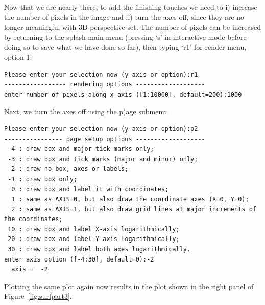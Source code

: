 \documentclass[a4paper,11pt]{article}
\begin{document}
 Now that we are nearly there, to add the finishing touches we need to i) increase the number of pixels in the image and ii) turn the axes off, since they are no longer meaningful with 3D perspective set. The number of pixels can be increased by returning to the splash main menu (pressing `s' in interactive mode before doing so to save what we have done so far), then typing `r1' for render menu, option 1:
\begin{verbatim}
Please enter your selection now (y axis or option):r1
----------------- rendering options -------------------
enter number of pixels along x axis ([1:10000], default=200):1000
\end{verbatim}
Next, we turn the axes off using the p)age submenu:
\begin{verbatim}
Please enter your selection now (y axis or option):p2
---------------- page setup options -------------------
 -4 : draw box and major tick marks only;
 -3 : draw box and tick marks (major and minor) only;
 -2 : draw no box, axes or labels;
 -1 : draw box only;
  0 : draw box and label it with coordinates;
  1 : same as AXIS=0, but also draw the coordinate axes (X=0, Y=0);
  2 : same as AXIS=1, but also draw grid lines at major increments of the coordinates;
 10 : draw box and label X-axis logarithmically;
 20 : draw box and label Y-axis logarithmically;
 30 : draw box and label both axes logarithmically.
enter axis option ([-4:30], default=0):-2
  axis =  -2
\end{verbatim}
 Plotting the same plot again now results in the plot shown in the right panel of Figure~\ref{fig:surfpart3}.
\end{document}

